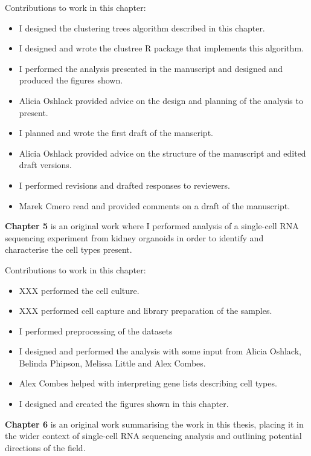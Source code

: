 \documentclass[11pt,a4paper,titlepage,twoside,openright]{style/unimelbthesis}
\theoremstyle{definition}
\theoremstyle{definition}
\theoremstyle{definition}
\theoremstyle{remark}
\begin{document}
\begin{frontmatter}
\begin{preface}
    Contributions to work in this chapter:
    
    \begin{itemize}
    \tightlist
    \item
      I designed the clustering trees algorithm described in this chapter.
    \item
      I designed and wrote the clustree R package that implements this algorithm.
    \item
      I performed the analysis presented in the manuscript and designed and produced the figures shown.
    \item
      Alicia Oshlack provided advice on the design and planning of the analysis to present.
    \item
      I planned and wrote the first draft of the manscript.
    \item
      Alicia Oshlack provided advice on the structure of the manuscript and edited draft versions.
    \item
      I performed revisions and drafted responses to reviewers.
    \item
      Marek Cmero read and provided comments on a draft of the manuscript.
    \end{itemize}
    
    \textbf{Chapter 5} is an original work where I performed analysis of a single-cell RNA sequencing experiment from kidney organoids in order to identify and characterise the cell types present.
    
    Contributions to work in this chapter:
    
    \begin{itemize}
    \tightlist
    \item
      XXX performed the cell culture.
    \item
      XXX performed cell capture and library preparation of the samples.
    \item
      I performed preprocessing of the datasets
    \item
      I designed and performed the analysis with some input from Alicia Oshlack, Belinda Phipson, Melissa Little and Alex Combes.
    \item
      Alex Combes helped with interpreting gene lists describing cell types.
    \item
      I designed and created the figures shown in this chapter.
    \end{itemize}
    
    \textbf{Chapter 6} is an original work summarising the work in this thesis, placing it in the wider context of single-cell RNA sequencing analysis and outlining potential directions of the field.
    

\end{preface}
\end{frontmatter}
\end{document}
